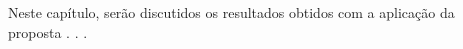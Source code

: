 \label{resultados}

Neste capítulo, serão discutidos os resultados obtidos com a aplicação da proposta  . . . 